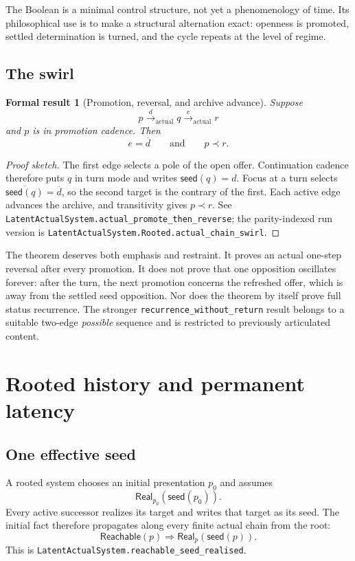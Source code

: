 \documentclass[11pt]{article}
\newtheorem{formalresult}{Formal result}[section]
\theoremstyle{definition}
\theoremstyle{remark}
\newcommand{\lean}[1]{\nolinkurl{#1}}
\newcommand{\Real}{\mathsf{Real}}
\newcommand{\Seed}{\mathsf{seed}}
\newcommand{\negd}[1]{\overline{#1}}
\begin{document}
The Boolean is a minimal control structure, not yet a phenomenology of time.
Its philosophical use is to make a structural alternation exact: openness is
promoted, settled determination is turned, and the cycle repeats at the level
of regime.

\subsection{The swirl}

\begin{formalresult}[Promotion, reversal, and archive advance]
Suppose
\[
  p\xrightarrow{d}_{\mathrm{actual}}q
  \xrightarrow{e}_{\mathrm{actual}}r
\]
and \(p\) is in promotion cadence. Then
\[
  e=\negd d
  \qquad\text{and}\qquad
  p\prec r.
\]
\end{formalresult}

\begin{proof}[Proof sketch]
The first edge selects a pole of the open offer. Continuation cadence therefore
puts \(q\) in turn mode and writes \(\Seed(q)=d\). Focus at a turn selects
\(\negd{\Seed(q)}=\negd d\), so the second target is the contrary of the first.
Each active edge advances the archive, and transitivity gives \(p\prec r\).
See \lean{LatentActualSystem.actual_promote_then_reverse}; the parity-indexed
run version is \lean{LatentActualSystem.Rooted.actual_chain_swirl}.
\end{proof}

The theorem deserves both emphasis and restraint. It proves an actual
one-step reversal after every promotion. It does not prove that one opposition
oscillates forever: after the turn, the next promotion concerns the refreshed
offer, which is away from the settled seed opposition. Nor does the theorem by
itself prove full status recurrence. The stronger
\lean{recurrence_without_return} result belongs to a suitable two-edge
\emph{possible} sequence and is restricted to previously articulated content.

\section{Rooted history and permanent latency}

\subsection{One effective seed}

A rooted system chooses an initial presentation \(p_0\) and assumes
\[
  \Real_{p_0}(\Seed(p_0)).
\]
Every active successor realizes its target and writes that target as its seed.
The initial fact therefore propagates along every finite actual chain from the
root:
\[
  \mathsf{Reachable}(p)\Rightarrow\Real_p(\Seed(p)).
\]
This is \lean{LatentActualSystem.reachable_seed_realised}.
\end{document}
